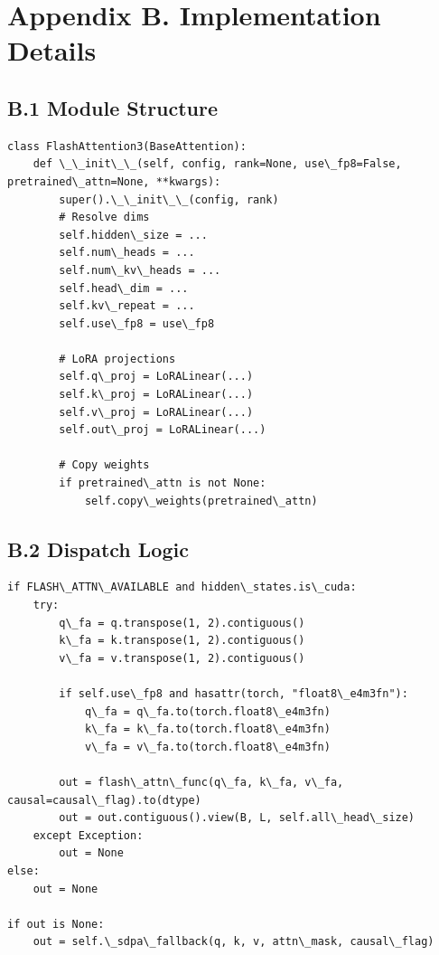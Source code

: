 \section{Appendix B. Implementation Details}

\subsection{B.1 Module Structure}

\begin{lstlisting}
class FlashAttention3(BaseAttention):
    def \_\_init\_\_(self, config, rank=None, use\_fp8=False, pretrained\_attn=None, **kwargs):
        super().\_\_init\_\_(config, rank)
        # Resolve dims
        self.hidden\_size = ...
        self.num\_heads = ...
        self.num\_kv\_heads = ...
        self.head\_dim = ...
        self.kv\_repeat = ...
        self.use\_fp8 = use\_fp8
        
        # LoRA projections
        self.q\_proj = LoRALinear(...)
        self.k\_proj = LoRALinear(...)
        self.v\_proj = LoRALinear(...)
        self.out\_proj = LoRALinear(...)
        
        # Copy weights
        if pretrained\_attn is not None:
            self.copy\_weights(pretrained\_attn)
\end{lstlisting}

\subsection{B.2 Dispatch Logic}

\begin{lstlisting}
if FLASH\_ATTN\_AVAILABLE and hidden\_states.is\_cuda:
    try:
        q\_fa = q.transpose(1, 2).contiguous()
        k\_fa = k.transpose(1, 2).contiguous()
        v\_fa = v.transpose(1, 2).contiguous()
        
        if self.use\_fp8 and hasattr(torch, "float8\_e4m3fn"):
            q\_fa = q\_fa.to(torch.float8\_e4m3fn)
            k\_fa = k\_fa.to(torch.float8\_e4m3fn)
            v\_fa = v\_fa.to(torch.float8\_e4m3fn)
        
        out = flash\_attn\_func(q\_fa, k\_fa, v\_fa, causal=causal\_flag).to(dtype)
        out = out.contiguous().view(B, L, self.all\_head\_size)
    except Exception:
        out = None
else:
    out = None

if out is None:
    out = self.\_sdpa\_fallback(q, k, v, attn\_mask, causal\_flag)
\end{lstlisting}


